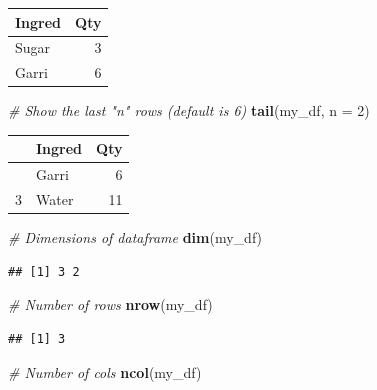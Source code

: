 \documentclass[
]{article}
\newenvironment{Shaded}{\begin{snugshade}}{\end{snugshade}}
\newcommand{\AttributeTok}[1]{\textcolor[rgb]{0.13,0.29,0.53}{#1}}
\newcommand{\CommentTok}[1]{\textcolor[rgb]{0.56,0.35,0.01}{\textit{#1}}}
\newcommand{\DecValTok}[1]{\textcolor[rgb]{0.00,0.00,0.81}{#1}}
\newcommand{\FunctionTok}[1]{\textcolor[rgb]{0.13,0.29,0.53}{\textbf{#1}}}
\newcommand{\NormalTok}[1]{#1}
\begin{document}
\begin{longtable}[]{@{}lr@{}}
\toprule\noalign{}
Ingred & Qty \\
\midrule\noalign{}
\endhead
\bottomrule\noalign{}
\endlastfoot
Sugar & 3 \\
Garri & 6 \\
\end{longtable}

\begin{Shaded}
\begin{Highlighting}[]
\CommentTok{\# Show the last "n" rows (default is 6)}
\FunctionTok{tail}\NormalTok{(my\_df, }\AttributeTok{n =} \DecValTok{2}\NormalTok{)}
\end{Highlighting}
\end{Shaded}

\begin{longtable}[]{@{}llr@{}}
\toprule\noalign{}
& Ingred & Qty \\
\midrule\noalign{}
\endhead
\bottomrule\noalign{}
\endlastfoot
2 & Garri & 6 \\
3 & Water & 11 \\
\end{longtable}

\begin{Shaded}
\begin{Highlighting}[]
\CommentTok{\# Dimensions of dataframe}
\FunctionTok{dim}\NormalTok{(my\_df)}
\end{Highlighting}
\end{Shaded}

\begin{verbatim}
## [1] 3 2
\end{verbatim}

\begin{Shaded}
\begin{Highlighting}[]
\CommentTok{\# Number of rows}
\FunctionTok{nrow}\NormalTok{(my\_df)}
\end{Highlighting}
\end{Shaded}

\begin{verbatim}
## [1] 3
\end{verbatim}

\begin{Shaded}
\begin{Highlighting}[]
\CommentTok{\# Number of cols}
\FunctionTok{ncol}\NormalTok{(my\_df)}
\end{Highlighting}
\end{Shaded}
\end{document}
